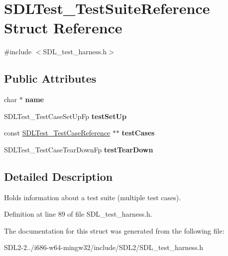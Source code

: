\hypertarget{structSDLTest__TestSuiteReference}{\section{S\+D\+L\+Test\+\_\+\+Test\+Suite\+Reference Struct Reference}
\label{structSDLTest__TestSuiteReference}
}


{\ttfamily \#include $<$S\+D\+L\+\_\+test\+\_\+harness.\+h$>$}

\subsection*{Public Attributes}
\begin{DoxyCompactItemize}
\item 
\hypertarget{structSDLTest__TestSuiteReference_a66cac3e63ced12e79314ca353e446fb7}{char $\ast$ {\bfseries name}}\label{structSDLTest__TestSuiteReference_a66cac3e63ced12e79314ca353e446fb7}

\item 
\hypertarget{structSDLTest__TestSuiteReference_a8aa788b982efb93c93c2ab01202e0007}{S\+D\+L\+Test\+\_\+\+Test\+Case\+Set\+Up\+Fp {\bfseries test\+Set\+Up}}\label{structSDLTest__TestSuiteReference_a8aa788b982efb93c93c2ab01202e0007}

\item 
\hypertarget{structSDLTest__TestSuiteReference_aaa0ee654346bd334745972dcdbe67345}{const \hyperlink{structSDLTest__TestCaseReference}{S\+D\+L\+Test\+\_\+\+Test\+Case\+Reference} $\ast$$\ast$ {\bfseries test\+Cases}}\label{structSDLTest__TestSuiteReference_aaa0ee654346bd334745972dcdbe67345}

\item 
\hypertarget{structSDLTest__TestSuiteReference_ad66abaf20653fd7361d28c69f88ac702}{S\+D\+L\+Test\+\_\+\+Test\+Case\+Tear\+Down\+Fp {\bfseries test\+Tear\+Down}}\label{structSDLTest__TestSuiteReference_ad66abaf20653fd7361d28c69f88ac702}

\end{DoxyCompactItemize}


\subsection{Detailed Description}
Holds information about a test suite (multiple test cases). 

Definition at line 89 of file S\+D\+L\+\_\+test\+\_\+harness.\+h.



The documentation for this struct was generated from the following file\+:\begin{DoxyCompactItemize}
\item 
S\+D\+L2-\/2../i686-\/w64-\/mingw32/include/\+S\+D\+L2/S\+D\+L\+\_\+test\+\_\+harness.\+h\end{DoxyCompactItemize}
